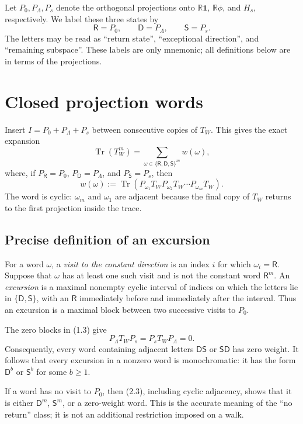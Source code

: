 \documentclass[11pt]{article}
\newcommand{\R}{\mathsf R}
\newcommand{\D}{\mathsf D}
\newcommand{\Ssafe}{\mathsf S}
\newcommand{\Tr}{\operatorname{Tr}}
\begin{document}
Let $P_0,P_\Lambda,P_s$ denote the orthogonal projections onto
$\mathbb R\mathbf 1$, $\mathbb R\phi$, and $H_s$, respectively.  We label
these three states by
\[
  \R=P_0,
  \qquad
  \D=P_\Lambda,
  \qquad
  \Ssafe=P_s.
\]
The letters may be read as ``return state'', ``exceptional direction'', and
``remaining subspace''.  These labels are only mnemonic; all definitions
below are in terms of the projections.

\section{Closed projection words}

Insert $I=P_0+P_\Lambda+P_s$ between consecutive copies of $T_W$.  This gives
the exact expansion
\[
  \Tr(T_W^m)
  =\sum_{\omega\in\{\R,\D,\Ssafe\}^m}w(\omega),
  \tag{2.1}
\]
where, if $P_{\R}=P_0$, $P_{\D}=P_\Lambda$, and $P_{\Ssafe}=P_s$, then
\[
  w(\omega)
  :=\Tr\!\left(
    P_{\omega_1}T_WP_{\omega_2}T_W\cdots
    P_{\omega_m}T_W
  \right).
  \tag{2.2}
\]
The word is cyclic: $\omega_m$ and $\omega_1$ are adjacent because the final
copy of $T_W$ returns to the first projection inside the trace.

\subsection{Precise definition of an excursion}

For a word $\omega$, a \emph{visit to the constant direction} is an index
$i$ for which $\omega_i=\R$.  Suppose that $\omega$ has at least one such
visit and is not the constant word $\R^m$.  An \emph{excursion} is a maximal
nonempty cyclic interval of indices on which the letters lie in
$\{\D,\Ssafe\}$, with an $\R$ immediately before and immediately after the
interval.  Thus an excursion is a maximal block between two successive
visits to $P_0$.

The zero blocks in (1.3) give
\[
  P_\Lambda T_WP_s=P_sT_WP_\Lambda=0.
  \tag{2.3}
\]
Consequently, every word containing adjacent letters $\D\Ssafe$ or
$\Ssafe\D$ has zero weight.  It follows that every excursion in a nonzero
word is monochromatic: it has the form $\D^b$ or $\Ssafe^b$ for some
$b\geq1$.

If a word has no visit to $P_0$, then (2.3), including cyclic adjacency,
shows that it is either $\D^m$, $\Ssafe^m$, or a zero-weight word.  This is
the accurate meaning of the ``no return'' class; it is not an additional
restriction imposed on a walk.
\end{document}
